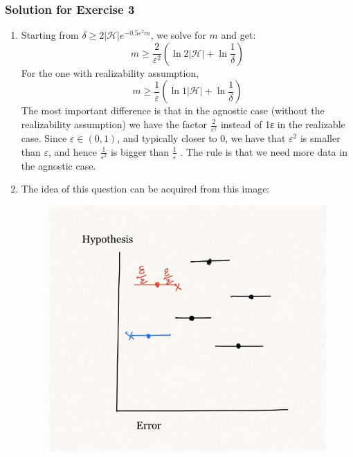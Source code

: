 \subsubsection{Solution for Exercise 3}
\begin{enumerate}
    \item Starting from $\delta \geq 2|\mathcal{H}|e^{-0.5\varepsilon^{2}m}$, we solve for $m$ and get:
\begin{equation*}
    m \geq \frac{2}{\varepsilon^{2}}\left(\ln 2|\mathcal{H}|+\ln \frac{1}{\delta}\right)
\end{equation*}
For the one with realizability assumption, 
\begin{equation*}
    m \geq \frac{1}{\varepsilon}\left(\ln 1|\mathcal{H}|+\ln \frac{1}{\delta}\right)
\end{equation*}
The most important difference is that in the agnostic case (without the realizability assumption) we have the factor $\frac{2}{\varepsilon^{2}}$
instead of 1ε in the realizable case. Since $\varepsilon \in (0,1)$, and typically closer to 0, we have that $\varepsilon^{2}$ is smaller than $\varepsilon$, and hence $\frac{1}{\varepsilon^{2}}$ is bigger than $\frac{1}{\varepsilon}$ . The rule is that we need more data in the agnostic case.\\
    \item The idea of this question can be acquired from this image:
    \begin{figure}[h]
        \centering
        \includegraphics[scale = 0.4]{misc/ex_2.png}

\end{figure}
\end{enumerate}
